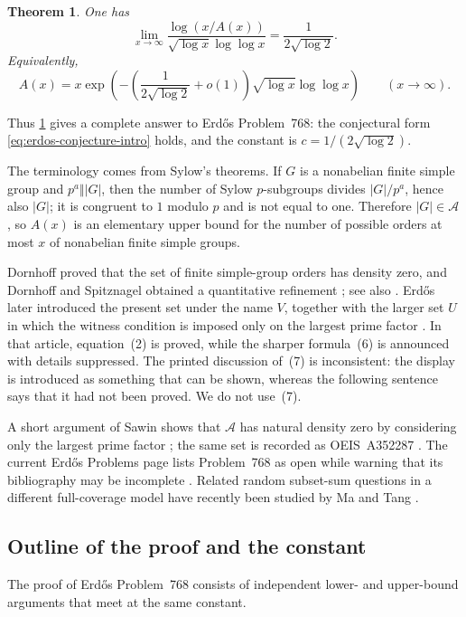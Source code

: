 \documentclass[11pt]{amsart}
\newtheorem{theorem}{Theorem}[section]
\theoremstyle{definition}
\theoremstyle{remark}
\numberwithin{equation}{section}
\newcommand{\Acal}{\mathcal A}
\begin{document}
\begin{theorem}\label{thm:main}
One has
\[
 \lim_{x\to\infty}
 \frac{\log(x/A(x))}{\sqrt{\log x}\log\log x}
 =\frac1{2\sqrt{\log 2}}.
\]
Equivalently,
\[
 A(x)=x\exp\!\left(-\left(\frac1{2\sqrt{\log 2}}+o(1)\right)
 \sqrt{\log x}\log\log x\right)
 \qquad (x\to\infty).
\]
\end{theorem}

Thus \cref{thm:main} gives a complete answer to Erd\H{o}s Problem~768: the conjectural form \eqref{eq:erdos-conjecture-intro} holds, and the constant is $c=1/(2\sqrt{\log 2})$.

The terminology comes from Sylow's theorems.  If $G$ is a nonabelian finite
simple group and $p^a\Vert |G|$, then the number of Sylow $p$-subgroups
divides $|G|/p^a$, hence also $|G|$; it is congruent to $1$ modulo $p$ and
is not equal to one.  Therefore $|G|\in\Acal$, so $A(x)$ is an elementary
upper bound for the number of possible orders at most $x$ of nonabelian
finite simple groups.

Dornhoff proved that the set of finite simple-group orders has density zero,
and Dornhoff and Spitznagel obtained a quantitative refinement
\cite{Dornhoff1968,DornhoffSpitznagel1968}; see also
\cite{SpitznagelSzygenda1968,HurleyRudvalis1977}.  Erd\H{o}s later introduced
the present set under the name $V$, together with the larger set $U$ in
which the witness condition is imposed only on the largest prime factor
\cite[p.~198]{Erdos1974}.  In that article, equation~(2) is proved, while
the sharper formula~(6) is announced with details suppressed.  The printed
discussion of~(7) is inconsistent: the display is introduced as something
that can be shown, whereas the following sentence says that it had not been
proved.  We do not use~(7).

A short argument of Sawin shows that $\Acal$ has natural density zero by
considering only the largest prime factor \cite{Sawin2021}; the same set is
recorded as OEIS~A352287 \cite{OEISA352287}.  The current Erd\H{o}s Problems
page lists Problem~768 as open while warning that its bibliography may be
incomplete \cite{ErdosProblems768}.  Related random subset-sum questions in
a different full-coverage model have recently been studied by Ma and Tang
\cite{MaTang2026}.

\subsection*{Outline of the proof and the constant}
The proof of Erd\H{o}s Problem~768 consists of independent lower- and upper-bound arguments that meet at the same constant.
\end{document}
